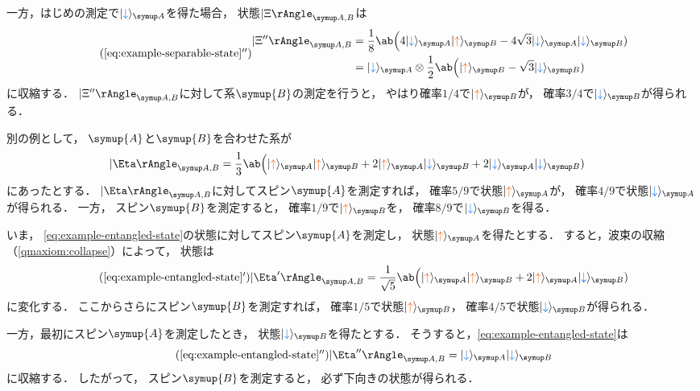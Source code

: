 \documentclass[
]{sotsu}
\newcommand{\bitone}{\mathcolor{fire}{\uparrow}}
\newcommand{\bittwo}{\mathcolor{water}{\downarrow}}
\begin{document}
一方，はじめの測定で$\ket{\bittwo}<A>$を得た場合，
状態$\Ket{\Xi}<A,B>$は
\begin{equation*}
    \tag{\ref*{eq:example-separable-state}$''$}
    \begin{split}
        \Ket{\Xi''}<A,B>
        &= \frac{1}{8} \ab\Big(
            4 \ket{\bittwo}<A> \ket{\bitone}<B>
            - 4 \sqrt{3} \ket{\bittwo}<A> \ket{\bittwo}<B>
        )
        \\
        &= \ket{\bittwo}<A>
            \otimes 
           \frac{1}{2} \ab\Big( \ket{\bitone}<B> - \sqrt{3} \ket{\bittwo}<B> )
    \end{split}
\end{equation*}
に収縮する．
$\Ket{\Xi''}<A,B>$に対して系$\symup{B}$の測定を行うと，
やはり確率$1/4$で$\ket{\bitone}<B>$が，
確率$3/4$で$\ket{\bittwo}<B>$が得られる．




\quad 
別の例として，
$\symup{A}$と$\symup{B}$を合わせた系が
\begin{equation}
    \label{eq:example-entangled-state}
    \begin{split}
        \Ket{\Eta}<A,B>
        &= \frac{1}{3} \ab\Big(
            \ket{\bitone}<A> \ket{\bitone}<B>
            + 2 \ket{\bitone}<A> \ket{\bittwo}<B>
            + 2 \ket{\bittwo}<A> \ket{\bittwo}<B>
        )
    \end{split}
\end{equation}
にあったとする．
$\Ket{\Eta}<A,B>$に対してスピン$\symup{A}$を測定すれば，
確率$5/9$で状態$\ket{\bitone}<A>$が，
確率$4/9$で状態$\ket{\bittwo}<A>$が得られる．
一方，
スピン$\symup{B}$を測定すると，
確率$1/9$で$\ket{\bitone}<B>$を，
確率$8/9$で$\ket{\bittwo}<B>$を得る．

いま，
\cref{eq:example-entangled-state}の状態に対してスピン$\symup{A}$を測定し，
状態$\ket{\bitone}<A>$を得たとする．
すると，波束の収縮（\cref{qmaxiom:collapse}）によって，
状態は
\begin{equation*}
    \tag{\ref*{eq:example-entangled-state}$'$}
    \Ket{\Eta'}<A,B> = \frac{1}{\sqrt{5}} \ab\Big(
        \ket{\bitone}<A> \ket{\bitone}<B>
        + 2 \ket{\bitone}<A> \ket{\bittwo}<B>
    )
\end{equation*}
に変化する．
ここからさらにスピン$\symup{B}$を測定すれば，
確率$1/5$で状態$\ket{\bitone}<B>$，
確率$4/5$で状態$\ket{\bittwo}<B>$が得られる．

一方，最初にスピン$\symup{A}$を測定したとき，
状態$\ket{\bittwo}<B>$を得たとする．
そうすると，\cref{eq:example-entangled-state}は
\begin{equation*}
    \tag{\ref*{eq:example-entangled-state}$''$}
    \Ket{\Eta''}<A,B> = \ket{\bittwo}<A> \ket{\bittwo}<B>
\end{equation*}
に収縮する．
したがって，
スピン$\symup{B}$を測定すると，
必ず下向きの状態が得られる．
\end{document}

